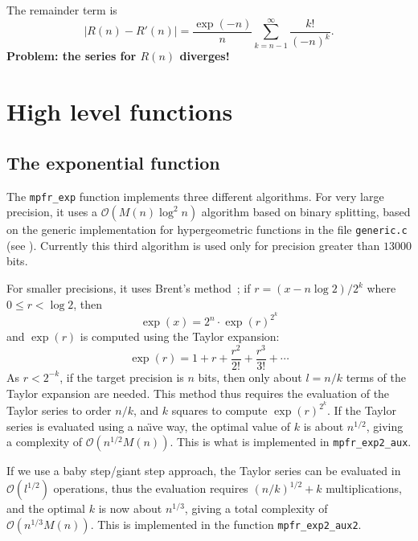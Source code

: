 \documentclass[12pt]{amsart}
\def\O{{\mathcal O}}
\begin{document}
The remainder term is
\[ |R(n) - R'(n)| = \frac{\exp(-n)}{n} 
	\sum_{k=n-1}^{\infty} \frac{k!}{(-n)^k}. \]
{\bf Problem: the series for $R(n)$ diverges!}

\section{High level functions}

\subsection{The exponential function}

The {\tt mpfr\_exp} function implements three different algorithms.
For very large precision, it uses a $\O(M(n) \log^2 n)$ algorithm
based on binary splitting, based on the generic implementation for
hypergeometric functions in the file {\tt generic.c} (see \cite{Jeandel00}).
Currently this third algorithm is used only for precision greater
than $13000$ bits.

For smaller precisions, it uses Brent's method~;
if $r = (x - n \log 2)/2^k$ where $0 \le r < \log 2$, then 
\[ \exp(x) = 2^n \cdot \exp(r)^{2^k} \]
and $\exp(r)$ is computed using the Taylor expansion:
\[ \exp(r) =  1 + r + \frac{r^2}{2!} + \frac{r^3}{3!} + \cdots \]
As $r < 2^{-k}$, if the target precision is $n$ bits, then only
about $l = n/k$ terms of the Taylor expansion are needed.
This method thus requires the evaluation of the Taylor series to
order $n/k$, and $k$ squares to compute $\exp(r)^{2^k}$.
If the Taylor series is evaluated using a na\"{\i}ve way, the optimal
value of $k$ is about $n^{1/2}$, giving a complexity of $\O(n^{1/2} M(n))$.
This is what is implemented in {\tt mpfr\_exp2\_aux}.

If we use a baby step/giant step approach, the Taylor series
can be evaluated in $\O(l^{1/2})$ operations, 
thus the evaluation requires $(n/k)^{1/2} + k$ multiplications,
and the optimal $k$ is now about $n^{1/3}$,
giving a total complexity of $\O(n^{1/3} M(n))$.
This is implemented in the function {\tt mpfr\_exp2\_aux2}.




\end{document}
